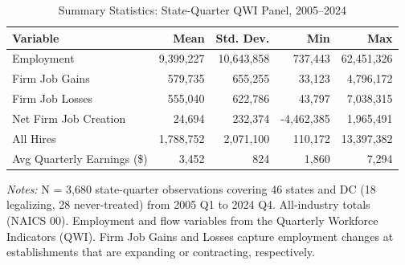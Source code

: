 \begin{table}[H]
\centering
\caption{Summary Statistics: State-Quarter QWI Panel, 2005--2024}
\begin{threeparttable}
\begin{tabular}{lrrrr}
\toprule
Variable & Mean & Std. Dev. & Min & Max \\
\midrule
Employment & 9,399,227 & 10,643,858 & 737,443 & 62,451,326 \\
Firm Job Gains & 579,735 & 655,255 & 33,123 & 4,796,172 \\
Firm Job Losses & 555,040 & 622,786 & 43,797 & 7,038,315 \\
Net Firm Job Creation & 24,694 & 232,374 & -4,462,385 & 1,965,491 \\
All Hires & 1,788,752 & 2,071,100 & 110,172 & 13,397,382 \\
Avg Quarterly Earnings (\$) & 3,452 & 824 & 1,860 & 7,294 \\
\bottomrule
\end{tabular}
\begin{tablenotes}[flushleft]
\small
\item \textit{Notes:} N = 3,680 state-quarter observations covering 46 states and DC (18 legalizing, 28 never-treated) from 2005 Q1 to 2024 Q4. All-industry totals (NAICS 00). Employment and flow variables from the Quarterly Workforce Indicators (QWI). Firm Job Gains and Losses capture employment changes at establishments that are expanding or contracting, respectively.
\end{tablenotes}
\end{threeparttable}
\label{tab:summary}
\end{table}

